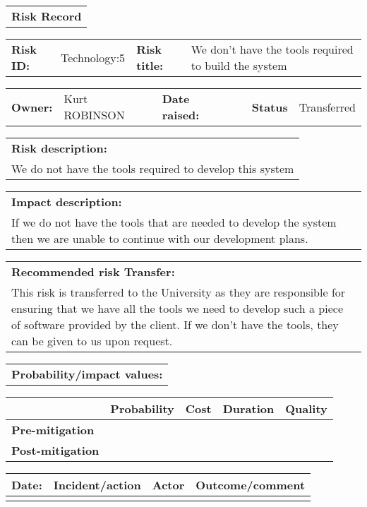 \begin{table}
	\begin{tabularx}{\textwidth}{| X |}
		\hline
		\textbf{Risk Record} \\
	\end{tabularx}
	\begin{tabularx}{\textwidth}{| l | X | l | X |}
		\hline
		\textbf{Risk ID:} & Technology:5 & \textbf{Risk title:} & We don't have the tools required to build the system \\
	\end{tabularx}
	\begin{tabularx}{\textwidth}{| l | X | l | X | l | X |}
		\hline
		\textbf{Owner:} & Kurt ROBINSON & \textbf{Date raised:} &  & \textbf{Status} & Transferred \\
	\end{tabularx}
	\begin{tabularx}{\textwidth}{| X |}
		\hline
		\textbf{Risk description:} \\ We do not have the tools required to develop this system  \\
	\end{tabularx}
	\begin{tabularx}{\textwidth}{| X |}
		\hline
		\textbf{Impact description:} \\ If we do not have the tools that are needed to develop the system then we are unable to continue with our development plans. \\
	\end{tabularx}
	\begin{tabularx}{\textwidth}{| X |}
		\hline
		\textbf{Recommended risk Transfer:} \\ This risk is transferred to the University as they are responsible for ensuring that we have all the tools we need to develop such a piece of software provided by the client. If we don't have the tools, they can be given to us upon request. \\
	\end{tabularx}
	\begin{tabularx}{\textwidth}{| X |}
		\hline
		\textbf{Probability/impact values:} \\
	\end{tabularx}
	\begin{tabularx}{\textwidth}{| l | l | X | X | X |}
		\hline
		 &  \textbf{Probability} & \textbf{Cost} & \textbf{Duration} & \textbf{Quality} \\ \hline
		\textbf{Pre-mitigation} & & & & \\ \hline
		\textbf{Post-mitigation} & & & & \\ \hline \hline
	\end{tabularx}
	\begin{tabularx}{\textwidth}{| l | X | l | X |}
		\hline
		\textbf{Date:} & \textbf{Incident/action} & \textbf{Actor} & \textbf{Outcome/comment} \\ \hline
		 &  &  &  \\ \hline
	\end{tabularx}
\end{table}
\FloatBarrier

